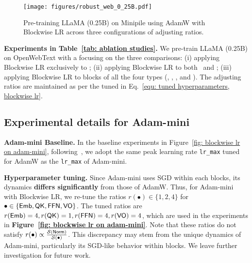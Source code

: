 \begin{figure}[!ht]
    \centering
    \texttt{[image: figures/robust\_web\_0\_25B.pdf]}
    \caption{Pre-training LLaMA (0.25B) on Minipile using AdamW with Blockwise LR across three configurations of adjusting ratios.}
    \label{fig: robust llama web}
\end{figure}


{\bf Experiments in Table~\ref{tab: ablation studies}.} We pre-train LLaMA (0.25B) on
OpenWebText with a focusing on the three comparisons: (i) applying Blockwise LR exclusively to \Embed; (ii) applying Blockwise LR to both \Embed\ and \FFN; (iii) applying Blockwise LR to blocks of all the four types (\Embed, \FFN, \QK, and \VO). The adjusting ratios are maintained as per the tuned in Eq.~\eqref{equ: tuned hyperparameters, blockwise lr}.




\subsection{Experimental details for Adam-mini}
\label{appendix: experiments for adam-mini}


{\bf Adam-mini Baseline.} In the baseline experiments in Figure~\ref{fig: blockwise lr on adam-mini}, following~\citet{zhang2024adam}, we adopt the same peak learning rate \texttt{lr\_max} tuned for AdamW as the \texttt{lr\_max} of Adam-mini.


{\bf Hyperparameter tuning.} Since Adam-mini uses SGD within each blocks, its dynamics {\bf differs significantly} from those of AdamW. Thus, for Adam-mini with Blockwise LR, we re-tune the ratios $r(\bullet)\in\{1,2,4\}$ for $\bullet\in\{\textnormal{\textsf{Emb}},\textnormal{\textsf{QK}},\textnormal{\textsf{FFN}},\textnormal{\textsf{VO}}\}$. The tuned ratios are $r(\textnormal{\textsf{Emb}})=4, r(\textnormal{\textsf{QK}})=1, r(\textnormal{\textsf{FFN}})=4, r(\textnormal{\textsf{VO}})=4$, which are used in the experiments in {\bf Figure~\ref{fig: blockwise lr on adam-mini}}.
Note that these ratios do not satisfy $r(\bullet)\propto\frac{\mathcal{S}(\textnormal{\textsf{Norm}})}{\mathcal{S}(\bullet)}$. This discrepancy may stem from the unique dynamics of Adam-mini, particularly its SGD-like behavior within blocks. We leave further investigation for future work.

















\vspace{1.cm}

